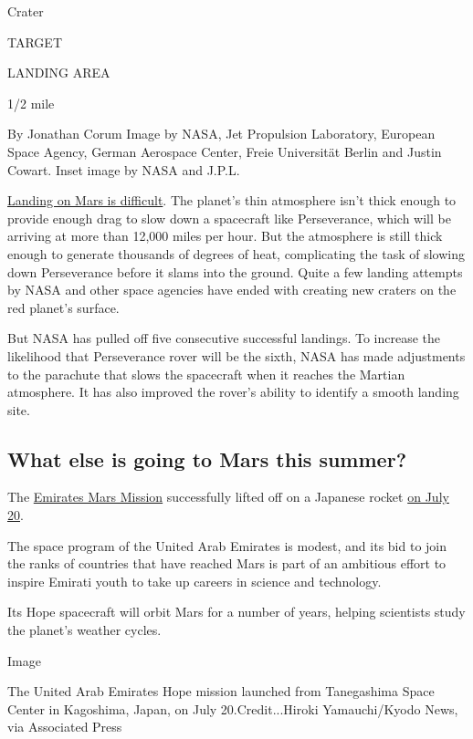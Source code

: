 Crater

TARGET

LANDING AREA

1/2 mile

By Jonathan Corum \textbar{} Image by NASA, Jet Propulsion Laboratory,
European Space Agency, German Aerospace Center, Freie Universität Berlin
and Justin Cowart. Inset image by NASA and J.P.L.

\href{https://www.nytimes.com/2020/07/29/science/nasa-mars-perseverance-rover.html}{Landing
on Mars is difficult}. The planet's thin atmosphere isn't thick enough
to provide enough drag to slow down a spacecraft like Perseverance,
which will be arriving at more than 12,000 miles per hour. But the
atmosphere is still thick enough to generate thousands of degrees of
heat, complicating the task of slowing down Perseverance before it slams
into the ground. Quite a few landing attempts by NASA and other space
agencies have ended with creating new craters on the red planet's
surface.

But NASA has pulled off five consecutive successful landings. To
increase the likelihood that Perseverance rover will be the sixth, NASA
has made adjustments to the parachute that slows the spacecraft when it
reaches the Martian atmosphere. It has also improved the rover's ability
to identify a smooth landing site.

\hypertarget{what-else-is-going-to-mars-this-summer}{%
\subsection{What else is going to Mars this
summer?}\label{what-else-is-going-to-mars-this-summer}}

The
\href{https://www.nytimes.com/2020/07/14/science/mars-united-arab-emirates.html}{Emirates
Mars Mission} successfully lifted off on a Japanese rocket
\href{https://www.nytimes.com/2020/07/19/science/emirates-mars-mission.html}{on
July 20}.

The space program of the United Arab Emirates is modest, and its bid to
join the ranks of countries that have reached Mars is part of an
ambitious effort to inspire Emirati youth to take up careers in science
and technology.

Its Hope spacecraft will orbit Mars for a number of years, helping
scientists study the planet's weather cycles.

Image

The United Arab Emirates Hope mission launched from Tanegashima Space
Center in Kagoshima, Japan, on July 20.Credit...Hiroki Yamauchi/Kyodo
News, via Associated Press

